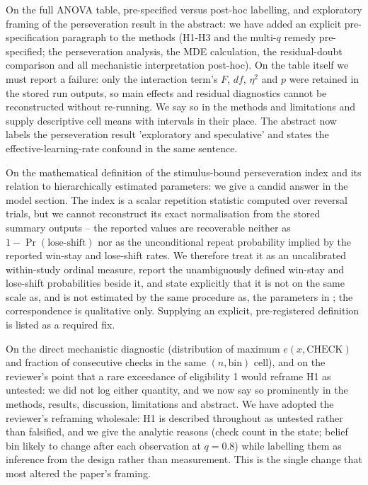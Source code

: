 \documentclass[11pt,a4paper]{article}
\begin{document}
On the full ANOVA table, pre-specified versus post-hoc labelling, and exploratory framing of the perseveration result in the abstract: we have added an explicit pre-specification paragraph to the methods (H1-H3 and the multi-$q$ remedy pre-specified; the perseveration analysis, the MDE calculation, the residual-doubt comparison and all mechanistic interpretation post-hoc). On the table itself we must report a failure: only the interaction term's $F$, $df$, $\eta^2$ and $p$ were retained in the stored run outputs, so main effects and residual diagnostics cannot be reconstructed without re-running. We say so in the methods and limitations and supply descriptive cell means with intervals in their place. The abstract now labels the perseveration result 'exploratory and speculative' and states the effective-learning-rate confound in the same sentence.

On the mathematical definition of the stimulus-bound perseveration index and its relation to hierarchically estimated parameters: we give a candid answer in the model section. The index is a scalar repetition statistic computed over reversal trials, but we cannot reconstruct its exact normalisation from the stored summary outputs -- the reported values are recoverable neither as $1-\Pr(\text{lose-shift})$ nor as the unconditional repeat probability implied by the reported win-stay and lose-shift rates. We therefore treat it as an uncalibrated within-study ordinal measure, report the unambiguously defined win-stay and lose-shift probabilities beside it, and state explicitly that it is not on the same scale as, and is not estimated by the same procedure as, the parameters in \citet{kanen2019computational}; the correspondence is qualitative only. Supplying an explicit, pre-registered definition is listed as a required fix.

On the direct mechanistic diagnostic (distribution of maximum $e(x,\mathrm{CHECK})$ and fraction of consecutive checks in the same $(n,\text{bin})$ cell), and on the reviewer's point that a rare exceedance of eligibility 1 would reframe H1 as untested: we did not log either quantity, and we now say so prominently in the methods, results, discussion, limitations and abstract. We have adopted the reviewer's reframing wholesale: H1 is described throughout as untested rather than falsified, and we give the analytic reasons (check count in the state; belief bin likely to change after each observation at $q=0.8$) while labelling them as inference from the design rather than measurement. This is the single change that most altered the paper's framing.
\end{document}

